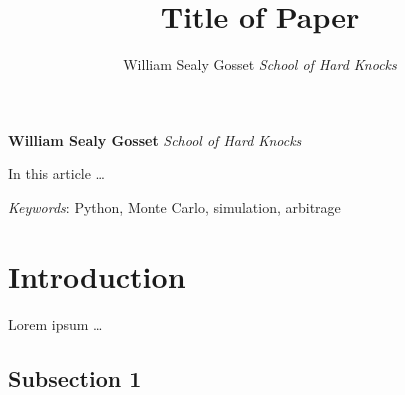\documentclass[11pt,]{article}
\title{Title of Paper  }
\author{\Large William Sealy Gosset\vspace{0.05in} \newline\normalsize\emph{School of Hard Knocks}  }
\date{}
\newcommand*{\authorfont}{\fontfamily{phv}\selectfont}
\renewenvironment{abstract}
 {{%
    \setlength{\leftmargin}{0mm}
    \setlength{\rightmargin}{\leftmargin}%
  }%
  \relax}
 {\endlist}
\begin{document}
	
%

{%
\setlength{\parindent}{0pt}
\thispagestyle{plain}
{\fontsize{18}{20}\selectfont\raggedright 
\maketitle  %

}

{
   \vskip 13.5pt\relax \normalsize\fontsize{11}{12} 
\textbf{\authorfont William Sealy Gosset} \hskip 15pt \emph{\small School of Hard Knocks}   

}

}







\begin{abstract}

    \hbox{\vrule height .2pt width 39.14pc}

    \vskip 8.5pt %

\noindent In this article \ldots{}


\vskip 8.5pt \noindent \emph{Keywords}: Python, Monte Carlo, simulation, arbitrage \par

    \hbox{\vrule height .2pt width 39.14pc}



\end{abstract}


\vskip 6.5pt

\noindent \doublespacing \begin{quote}
\end{quote}

\section{Introduction}\label{introduction}

Lorem ipsum \ldots{}

\subsection{Subsection 1}\label{subsection-1}
\end{document}
